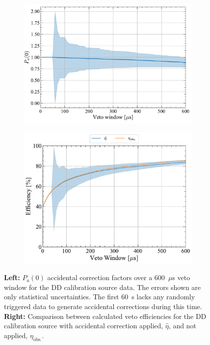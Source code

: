 \begin{figure}[!ht]
    \centering
    \begin{subfigure}[b]{0.49\textwidth}
        \centering
        \includegraphics[width=\textwidth]{figures/VetoEfficiency/SR3DDdirect_Corrections_100k.pdf}
        \caption{}
        \label{fig:VetoEff/DDAccCorrectionParameters}
    \end{subfigure}
    \hfill
    \begin{subfigure}[b]{0.49\textwidth}
        \centering
        \includegraphics[width=\textwidth]{figures/VetoEfficiency/DDAccidentalCheck.pdf}
        \caption{}
        \label{fig:VetoEff/DDAccCorrectionImpact_P0}
    \end{subfigure}
    \caption{\textbf{Left:} $P_a(0)$ accidental correction factors over a 600~$\mu$s veto window for the DD calibration source data. The errors shown are only statistical uncertainties. The first 60~\textmu s lacks any randomly triggered data to generate accidental corrections during this time. \textbf{Right:} Comparison between calculated veto efficiencies for the DD calibration source with accidental correction applied, $\hat{\eta}$, and not applied, $\eta_\text{obs.}$.}
    \label{fig:VetoEff/DDAccidentalPlots}
\end{figure}


